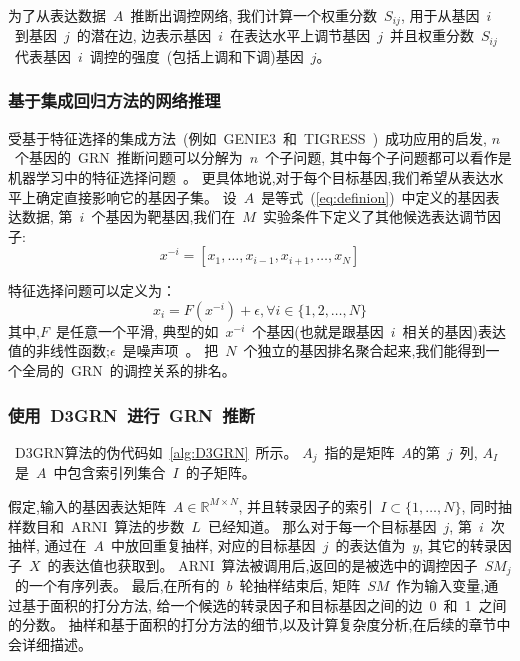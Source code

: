 为了从表达数据~$A$~推断出调控网络,
我们计算一个权重分数~$S_{ij}$,
用于从基因~$i$~到基因~$j$~的潜在边,
边表示基因~$i$~在表达水平上调节基因~$j$~并且权重分数~$S_{ij}$~代表基因~$i$~调控的强度~(包括上调和下调)基因~$j$。

\subsubsection{基于集成回归方法的网络推理}
受基于特征选择的集成方法~(例如~GENIE3~\cite{huynh2010inferring}和~TIGRESS~\cite{Haury2012})~成功应用的启发,
$n$~个基因的~GRN~推断问题可以分解为~$n$~个子问题,
其中每个子问题都可以看作是机器学习中的特征选择问题~\cite{nasrabadi2007pattern}。
更具体地说,对于每个目标基因,我们希望从表达水平上确定直接影响它的基因子集。
设~$A$~是等式~(\ref{eq:definion})~中定义的基因表达数据,
第~$i$~个基因为靶基因,我们在~$M$~实验条件下定义了其他候选表达调节因子:
\begin{equation}
  \label{eq:x}
  x^{-i} = [x_1,\ldots,x_{i-1},x_{i+1},\ldots,x_N]
  \end{equation}

特征选择问题可以定义为：
\begin{equation}
\label{eq:fs}
x_i =  F(x^{-i}) + \epsilon , \forall i \in \{1,2,\ldots,N\}
\end{equation}
其中,$F$~是任意一个平滑, 典型的如~$x^{-i}$~个基因(也就是跟基因~$i$~相关的基因)表达值的非线性函数;$\epsilon$~是噪声项~\cite{huynh2010inferring,Haury2012}。
把~$N$~个独立的基因排名聚合起来,我们能得到一个全局的~GRN~的调控关系的排名。

\subsubsection{使用~D3GRN~进行~GRN~推断}

~D3GRN算法的伪代码如~\ref{alg:D3GRN}~所示。
$A_j$~指的是矩阵~$A$的第~$j$~列, 
$A_I$~是~$A$~中包含索引列集合~$I$~的子矩阵。

假定,输入的基因表达矩阵~$A \in \mathbb{R}^{M \times N}$, 
并且转录因子的索引~$I \subset \{1,\ldots,N\}$, 
同时抽样数目和~ARNI~算法的步数~$L$~已经知道。
那么对于每一个目标基因~$j$, 第~$i$~次抽样,
通过在~$A$~中放回重复抽样,
对应的目标基因~$j$~的表达值为~$y$, 
其它的转录因子~$X$~的表达值也获取到。
ARNI~算法被调用后,返回的是被选中的调控因子~$SM_j$~的一个有序列表。
最后,在所有的~$b$~轮抽样结束后,
矩阵~$SM$~作为输入变量,通过基于面积的打分方法,
给一个候选的转录因子和目标基因之间的边~0~和~1~之间的分数。
抽样和基于面积的打分方法的细节,以及计算复杂度分析,在后续的章节中会详细描述。
 
